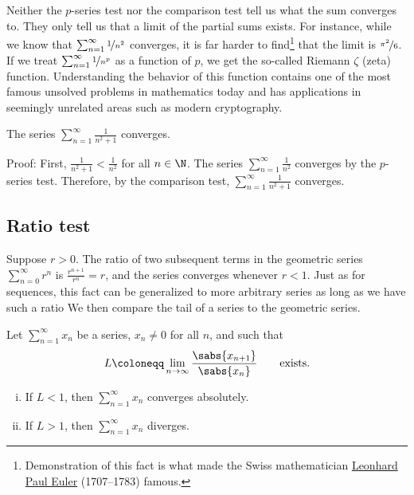 Neither the $p$-series test nor the comparison test 
tell us what the sum converges to.  They only tell us that a limit
of the partial sums exists.  For instance, while we know that
$\sum_{n=1}^\infty \nicefrac{1}{n^2}$ converges, it is far harder to
find\footnote{Demonstration of this fact is
what made the Swiss mathematician
\href{https://en.wikipedia.org/wiki/Leonhard_Euler}{Leonhard Paul Euler}
(1707--1783)
famous.}
that the limit is $\nicefrac{\pi^2}{6}$.
If we treat $\sum_{n=1}^\infty \nicefrac{1}{n^p}$ as a function of $p$,
we get the so-called Riemann $\zeta$ (zeta) function.  Understanding the
behavior of this function contains
one of the most famous unsolved problems in mathematics today and has applications
in seemingly unrelated areas such as modern cryptography.

\begin{example}
The series $\sum_{n=1}^\infty \frac{1}{n^2+1}$ converges.

Proof:  First, $\frac{1}{n^2+1} < \frac{1}{n^2}$ for all $n \in \N$.
The series $\sum_{n=1}^\infty \frac{1}{n^2}$ converges by the $p$-series test.
Therefore, by the comparison test, $\sum_{n=1}^\infty \frac{1}{n^2+1}$ converges.
\end{example}

\subsection{Ratio test}

Suppose $r > 0$.  The ratio of two subsequent terms in the geometric series
$\sum_{n=0}^\infty r^n$ is $\frac{r^{n+1}}{r^n} = r$, and the series converges
whenever $r < 1$.  Just as for sequences, this fact
can be generalized to more arbitrary series
as long as we have such a ratio   We then compare
the tail of a series to the geometric series.


\begin{prop}
Let $\sum_{n=1}^\infty x_n$ be a series, $x_n \not= 0$ for all $n$, and such that
\begin{equation*}
L \coloneqq \lim_{n\to\infty} \frac{\sabs{x_{n+1}}}{\sabs{x_n}}
\qquad \text{exists.}
\end{equation*}
\begin{enumerate}[(i)]
\item
If $L < 1$, then $\sum_{n=1}^\infty x_n$ converges absolutely.
\item
If $L > 1$, then $\sum_{n=1}^\infty x_n$ diverges.
\end{enumerate}
\end{prop}

